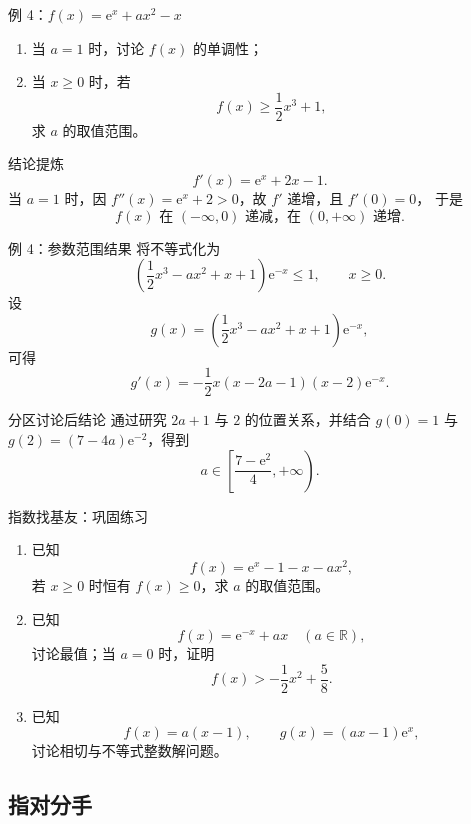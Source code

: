 ﻿\documentclass[aspectratio=169,11pt]{ctexbeamer}
\newcommand{\e}{\mathrm{e}}
\newcommand{\R}{\mathbb{R}}
\begin{document}
\begin{frame}{例 4：$f(x)=\e^x+ax^2-x$}
\small
\begin{enumerate}
  \item 当 $a=1$ 时，讨论 $f(x)$ 的单调性；
  \item 当 $x\ge 0$ 时，若
  \[
  f(x)\ge \frac12x^3+1,
  \]
  求 $a$ 的取值范围。
\end{enumerate}

\begin{block}{结论提炼}
\[
f'(x)=\e^x+2x-1.
\]
当 $a=1$ 时，因 $f''(x)=\e^x+2>0$，故 $f'$ 递增，且 $f'(0)=0$，
于是
\[
f(x)\text{ 在 }(-\infty,0)\text{ 递减，在 }(0,+\infty)\text{ 递增}.
\]
\end{block}
\end{frame}

\begin{frame}{例 4：参数范围结果}
\small
将不等式化为
\[
\left(\frac12x^3-ax^2+x+1\right)\e^{-x}\le 1,\qquad x\ge 0.
\]
设
\[
g(x)=\left(\frac12x^3-ax^2+x+1\right)\e^{-x},
\]
可得
\[
g'(x)=-\frac12x(x-2a-1)(x-2)\e^{-x}.
\]

\begin{block}{分区讨论后结论}
通过研究 $2a+1$ 与 $2$ 的位置关系，并结合 $g(0)=1$ 与 $g(2)=(7-4a)\e^{-2}$，得到
\[
\boxed{a\in \left[\frac{7-\e^2}{4},+\infty\right)}.
\]
\end{block}
\end{frame}

\begin{frame}{指数找基友：巩固练习}
\small
\begin{enumerate}
  \item 已知
  \[
  f(x)=\e^x-1-x-ax^2,
  \]
  若 $x\ge 0$ 时恒有 $f(x)\ge 0$，求 $a$ 的取值范围。
  \item 已知
  \[
  f(x)=\e^{-x}+ax\quad (a\in \R),
  \]
  讨论最值；当 $a=0$ 时，证明
  \[
  f(x)>-\frac12x^2+\frac58.
  \]
  \item 已知
  \[
  f(x)=a(x-1),\qquad g(x)=(ax-1)\e^x,
  \]
  讨论相切与不等式整数解问题。
\end{enumerate}
\end{frame}

\subsection{指对分手}
\end{document}
